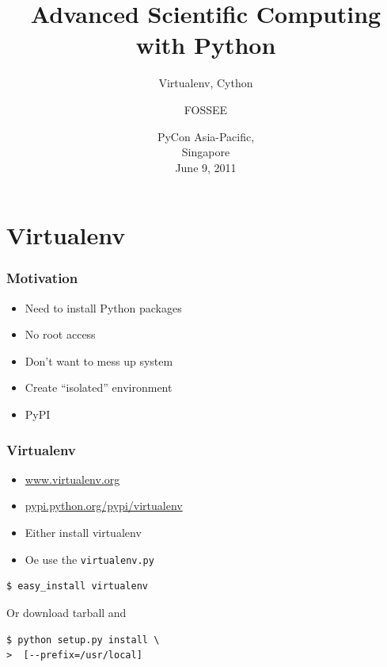 \documentclass[14pt,compress]{beamer}
\title[Advanced Sci Comp.]{Advanced Scientific Computing with
Python}
\subtitle{Virtualenv, Cython }
\author[FOSSEE] {FOSSEE}
\institute[IIT Bombay] {Department of Aerospace Engineering\\IIT Bombay}
\date[] {PyCon Asia-Pacific,\\
Singapore\\
June 9, 2011
}
\newcommand{\typ}[1]{\lstinline{#1}}
\begin{document}
\begin{frame}
  \maketitle
\end{frame}


\section{Virtualenv}


\begin{frame}
  \frametitle{Motivation}
  \begin{itemize}

      \item Need to install Python packages

      \item No root access

      \item Don't want to mess up system

      \item Create ``isolated'' environment

      \item PyPI
  
  \end{itemize}

\end{frame}

\begin{frame}[fragile]
  \frametitle{Virtualenv}

  \begin{itemize}
    \item  \url{www.virtualenv.org} 

    \item \url{pypi.python.org/pypi/virtualenv}

    \item Either install virtualenv 
        
    \item Oe use the \typ{virtualenv.py}

  \end{itemize}

  \begin{lstlisting}
$ easy_install virtualenv
  \end{lstlisting}
Or download tarball and
  \begin{lstlisting}
$ python setup.py install \
>  [--prefix=/usr/local]
  \end{lstlisting}

\end{frame}
\end{document}
